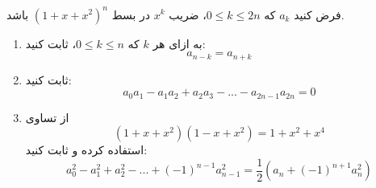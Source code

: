     \p
    فرض کنید 
	$a_k$
	كه
	$0 \leq k \leq 2n$،
	 ضریب 
	 $x^k$ در بسط $(1 + x + x^2)^n$ باشد.
	\begin{enumerate}
        \item
    	به ازای هر $k$
		كه
		$0 \leq k \leq n$،
		ثابت کنید:
		 $$a_{n-k} = a_{n+k}$$
    	\item
    	ثابت کنید:
        $$a_0a_1 - a_1a_2 + a_2a_3 - ... - a_{2n-1}a_{2n} = 0$$
    	\item
    	از تساوی
    	$$(1 + x + x^2)(1 - x + x^2) = 1 + x^2 + x^4$$
    	استفاده کرده و ثابت کنید:
    	$$a_0^2 - a_1^2 + a_2^2 - ... + (-1)^{n - 1}a_{n - 1}^2 = \frac{1}{2}(a_n + (-1)^{n + 1}a_n^2)$$
    	
	\end{enumerate}
